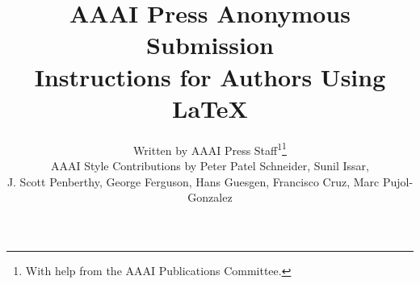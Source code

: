 \documentclass[letterpaper]{article} %
\title{AAAI Press Anonymous Submission\\Instructions for Authors Using \LaTeX{}}
\author{
    Written by AAAI Press Staff\textsuperscript{\rm 1}\thanks{With help from the AAAI Publications Committee.}\\
    AAAI Style Contributions by Peter Patel Schneider,
    Sunil Issar,\\
    J. Scott Penberthy,
    George Ferguson,
    Hans Guesgen,
    Francisco Cruz\equalcontrib\corresponding,
    Marc Pujol-Gonzalez\equalcontrib\corresponding
}
\begin{document}
\maketitle

\begin{abstract}

\end{abstract}

%
%

%
%


\end{document}
